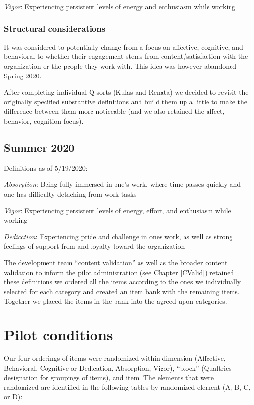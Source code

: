 \documentclass[
]{book}
\begin{document}
\emph{Vigor}: Experiencing persistent levels of energy and enthusiasm while working

\hypertarget{structural-considerations}{%
\subsection{Structural considerations}\label{structural-considerations}}

It was considered to potentially change from a focus on affective, cognitive, and behavioral to whether their engagement stems from content/satisfaction with the organization or the people they work with. This idea was however abandoned Spring 2020.

After completing individual Q-sorts (Kulas and Renata) we decided to revisit the originally specified substantive definitions and build them up a little to make the difference between them more noticeable (and we also retained the affect, behavior, cognition focus).

\hypertarget{summer-2020}{%
\section{Summer 2020}\label{summer-2020}}

Definitions as of 5/19/2020:

\emph{Absorption}: Being fully immersed in one's work, where time passes quickly and one has difficulty detaching from work tasks

\emph{Vigor}: Experiencing persistent levels of energy, effort, and enthusiasm while working

\emph{Dedication}: Experiencing pride and challenge in ones work, as well as strong feelings of support from and loyalty toward the organization

The development team ``content validation'' as well as the broader content validation to inform the pilot administration (see Chapter \ref{CValid}) retained these definitions we ordered all the items according to the ones we individually selected for each category and created an item bank with the remaining items. Together we placed the items in the bank into the agreed upon categories.

\hypertarget{pilot2}{%
\chapter{Pilot conditions}\label{pilot2}}

Our four orderings of items were randomized within dimension (Affective, Behavioral, Cognitive or Dedication, Absorption, Vigor), ``block'' (Qualtrics designation for groupings of items), and item. The elements that were randomized are identified in the following tables by randomized element (A, B, C, or D):
\end{document}
